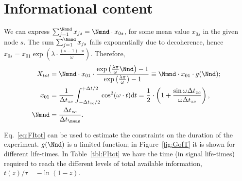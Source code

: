 \documentclass{article}
\newcommand{\dt}{\Delta t}
\newcommand{\dtm}{\dt_{\meas}}
\begin{document}
\section{Informational content}
\newcommand{\dtnd}{\dt_{zc}}

We can express $\sum_{j=1}^{\Nmnd} x_{js} = \Nmnd \cdot x_{0s}$, for some mean value $x_{0s}$ in the given node $s$. The sum $\sum_{j=1}^{\Nmnd} x_{js}$ falls exponentially due to decoherence, hence $x_{0s} = x_{01}\exp{(\lambda\cdot \frac{(s-1)\cdot\pi}{\omega})}$. Therefore,
\begin{align}
	X_{tot} & = \Nmnd\cdot x_{01} \cdot \frac{\exp{\bkt{\frac{\lambda\pi}{\omega}\Nnd}}-1}{\exp{\bkt{\frac{\lambda\pi}{\omega}}}-1} 
	\equiv \Nmnd \cdot x_{01}\cdot g(\Nnd); \label{eq:FItot}\\
	x_{01}  & = \frac{1}{\dtnd}\int_{-\dtnd/2}^{+\dt/2}\cos^2(\omega\cdot t)\td t = \frac12\cdot \bkt{1 + \frac{\sin\omega\dtnd}{\omega\dtnd}},                                    \label{eq:MeanFIZC}   \\
	\Nmnd   & = \frac{\dtnd}{\dtm}. \label{eq:NumMeasNode}
\end{align}

Eq.~\eqref{eq:FItot} can be used to estimate the constraints on the duration of the experiment. $g(\Nnd)$ is a limited function; in Figure~\ref{fig:GofT} it is shown for different life-times. In Table~\ref{tbl:FItot} we have the time (in signal life-times) required to reach the different levels of total available information, $t(z)/\tau = -\ln(1-z)$. 
\end{document}
